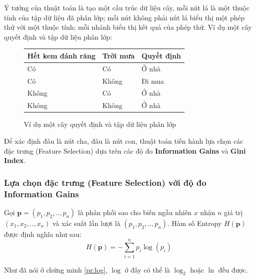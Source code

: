 \documentclass[12pt]{article}
\begin{document}
Ý tưởng của thuật toán là tạo một cấu trúc dữ liệu cây, mỗi nút lá là một thuộc tính của tập dữ liệu đã phân lớp; mỗi nút không phải nút lá biểu thị một phép thử với một thuộc tính; mỗi nhánh biểu thị kết quả của phép thử. Ví dụ một cây quyết định và tập dữ liệu phân lớp:
\begin{figure}[H]
\begin{multicols}{2}

\begin{tabular}{|l|l|l|}
	\hline
	Hết kem đánh răng & Trời mưa & Quyết định \\
	\hline
	Có & Có & Ở nhà \\
	Có & Không & Đi mua \\
	Không & Có & Ở nhà \\
	Không & Không & Ở nhà \\
	\hline
\end{tabular}
\end{multicols}
\caption{Ví dụ một cây quyết định và tập dữ liệu phân lớp}
\end{figure}
Để xác định đâu là nút cha, đâu là nút con, thuật toán tiến hành lựa chọn các đặc trưng (Feature Selection) dựa trên các độ đo \textbf{Information Gains} và \textbf{Gini Index}.

\subsubsection{Lựa chọn đặc trưng (Feature Selection) với độ đo Information Gains}
Gọi $\mathbf{p} = (p_1, p_2, .., p_n)$ là phân phối sao cho biến ngẫu nhiên $x$ nhận $n$ giá trị $(x_1, x_2, .., x_n)$ và xác suất lần lượt là $(p_1, p_2, .., p_n)$. Hàm số Entropy $H(\mathbf{p})$ được định nghĩa như sau:
\begin{equation}
H(\mathbf{p}) = -\sum_{i = 1}^n p_i \log(p_i)
\end{equation}

Như đã nói ở chứng minh \ref{pr:log}, $\log$ ở đây có thể là $\log_2$ hoặc $\ln$ đều được.
\end{document}

